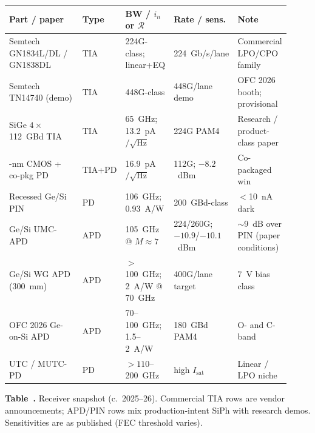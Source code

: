 \begin{table}[ht]
\label{tab:rx-records}%
\centering
\setlength{\tabcolsep}{3pt}%
\footnotesize
\renewcommand{\arraystretch}{1.25}%
\begin{tabular}{@{}p{0.26\linewidth}p{0.14\linewidth}p{0.16\linewidth}p{0.18\linewidth}p{0.18\linewidth}@{}}
\toprule
Part / paper & Type & BW / $i_n$ or $\mathcal{R}$ & Rate / sens. & Note \\
\midrule
Semtech GN1834L/DL / GN1838DL & TIA & 224G-class; linear+EQ & 224~Gb/s/lane & Commercial LPO/CPO family \\
\addlinespace[1.5em]
Semtech TN14740 (demo) & TIA & 448G-class & 448G/lane demo & OFC 2026 booth; provisional \\
\addlinespace[1.5em]
SiGe $4\times$112~GBd TIA & TIA & 65~GHz; 13.2~pA$/\sqrt{\mathrm{Hz}}$ & 224G PAM4 & Research / product-class paper \\
\addlinespace[1.5em]
16-nm CMOS + co-pkg PD & TIA+PD & 16.9~pA$/\sqrt{\mathrm{Hz}}$ & 112G; $-8.2$~dBm & Co-packaged win \\
\addlinespace[1.5em]
Recessed Ge/Si PIN & PD & 106~GHz; 0.93~A/W & 200~GBd-class & $<$10~nA dark \\
\addlinespace[1.5em]
Ge/Si UMC-APD & APD & 105~GHz @ $M\!\approx\!7$ & 224/260G; $-10.9$/$-10.1$~dBm & $\sim$9~dB over PIN (paper conditions) \\
\addlinespace[1.5em]
Ge/Si WG APD (300~mm) & APD & $>$100~GHz; 2~A/W @ 70~GHz & 400G/lane target & 7~V bias class \\
\addlinespace[1.5em]
OFC 2026 Ge-on-Si APD & APD & 70--100~GHz; 1.5--2~A/W & 180~GBd PAM4 & O- and C-band \\
\addlinespace[1.5em]
UTC / MUTC-PD & PD & $>\!110$--200~GHz & high $I_{\mathrm{sat}}$ & Linear / LPO niche \\
\bottomrule
\end{tabular}
\par\medskip
{\raggedright\footnotesize\textbf{Table~\thetable.} Receiver snapshot (c.~2025--26).
Commercial TIA rows are vendor announcements; APD/PIN rows mix production-intent
SiPh with research demos. Sensitivities are as published (FEC threshold varies).\par}
\end{table}

